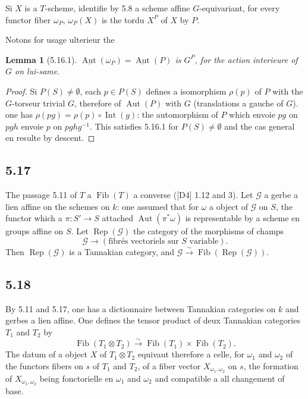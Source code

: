 \documentclass[12pt,a4paper]{article}
\theoremstyle{plain}
\newtheorem{lemma}[theorem]{Lemma}
\theoremstyle{definition}
\theoremstyle{remark}
\DeclareMathOperator{\Aut}{Aut}
\DeclareMathOperator{\Rep}{Rep}
\DeclareMathOperator{\Int}{Int}
\DeclareMathOperator{\Fib}{Fib}
\begin{document}
Si $X$ is a $T$-scheme, identifie by 5.8 a scheme affine $G$-equivariant, for every functor fiber $\omega_P$, $\omega_P(X)$ is the tordu $X^P$ of $X$ by $P$.

Notons for usage ulterieur the
\begin{lemma}[5.16.1]\label{lem:5.16.1}
$\underline{\Aut}(\omega_P) = 
\underline{\Aut}(P)$ is $G^P$, for the action interieure of $G$ on lui-same.
\end{lemma}

\begin{proof}
Si $P(S) 
\neq 
\emptyset$, each $p 
\in P(S)$ defines a isomorphism $\rho(p)$ of $P$ with the $G$-torseur trivial $G$, therefore of $\Aut(P)$ with $G$ (translations a gauche of $G$). one has $\rho(pg) = 
\rho(p) 
\circ 
\Int(g)$: the automorphism of $P$ which envoie $pg$ on $pgh$ envoie $p$ on $pghg^{-1}$. This satisfies 5.16.1 for $P(S) 
\neq 
\emptyset$ and the cas general en resulte by descent.
\end{proof}

\subsection*{5.17}
The passage 5.11 of $T$ a $\Fib(T)$ a converse ([D4] 1.12 and 3). Let $\mathcal{G}$ a gerbe a lien affine on the schemes on $k$: one assumed that for $\omega$ a object of $\mathcal{G}$ on $S$, the functor which a $\pi: S' 
\to S$ attached $\Aut(\pi^*\omega)$ is representable by a scheme en groups affine on $S$. Let $\Rep(\mathcal{G})$ the category of the morphisms of champs
\[
\mathcal{G} 
\longrightarrow (\text{fibrés vectoriels sur } S \text{ variable}).
\]
Then $\Rep(\mathcal{G})$ is a Tannakian category, and $\mathcal{G} 
\xrightarrow{\sim} 
\Fib(\Rep(\mathcal{G}))$.

\subsection*{5.18}
By 5.11 and 5.17, one has a dictionnaire between Tannakian categories on $k$ and gerbes a lien affine. One defines the tensor product of deux Tannakian categories $T_1$ and $T_2$ by
\[
\Fib(T_1 
\otimes T_2) 
\xrightarrow{\sim} 
\Fib(T_1) 
\times 
\Fib(T_2).
\]
The datum of a object $X$ of $T_1 
\otimes T_2$ equivaut therefore a celle, for $\omega_1$ and $\omega_2$ of the functors fibers on $s$ of $T_1$ and $T_2$, of a fiber vector $X_{\omega_1,\omega_2}$ on $s$, the formation of $X_{\omega_1,\omega_2}$ being fonctorielle en $\omega_1$ and $\omega_2$ and compatible a all changement of base.
\end{document}
